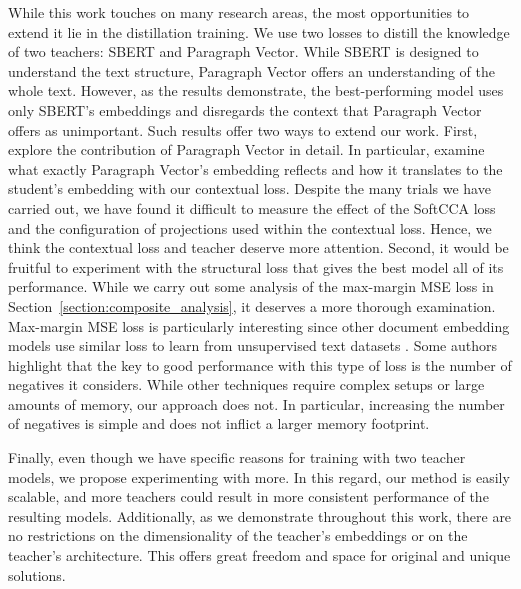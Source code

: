 While this work touches on many research areas, the most opportunities to
extend it lie in the distillation training. We use two losses to distill the
knowledge of two teachers: SBERT and Paragraph Vector. While SBERT is designed
to understand the text structure, Paragraph Vector offers an understanding of
the whole text. However, as the results demonstrate, the best-performing model
uses only SBERT's embeddings and disregards the context that Paragraph Vector
offers as unimportant. Such results offer two ways to extend our work. First,
explore the contribution of Paragraph Vector in detail. In particular, examine
what exactly Paragraph Vector's embedding reflects and how it translates to the
student's embedding with our contextual loss. Despite the many trials we have
carried out, we have found it difficult to measure the effect of the SoftCCA
loss and the configuration of projections used within the contextual loss.
Hence, we think the contextual loss and teacher deserve more attention. Second,
it would be fruitful to experiment with the structural loss that gives the best
model all of its performance. While we carry out some analysis of the
max-margin MSE loss in Section~\ref{section:composite_analysis}, it deserves a
more thorough examination. Max-margin MSE loss is particularly interesting
since other document embedding models use similar loss to learn from
unsupervised text datasets
\citep{cohan2020specter,ostendorff2022neighborhood,neelakantan2022text,izacard2021unsupervised}.
Some authors \citep{neelakantan2022text,izacard2021unsupervised} highlight that the key to good performance with this type of loss is the number of negatives it considers. While other
techniques require complex setups or large amounts of memory, our approach does
not. In particular, increasing the number of negatives is simple and does not
inflict a larger memory footprint.

Finally, even though we have specific reasons for training with two teacher
models, we propose experimenting with more. In this regard, our method is
easily scalable, and more teachers could result in more consistent performance
of the resulting models. Additionally, as we demonstrate throughout this work,
there are no restrictions on the dimensionality of the teacher's embeddings or
on the teacher's architecture. This offers great freedom and space for original
and unique solutions.
